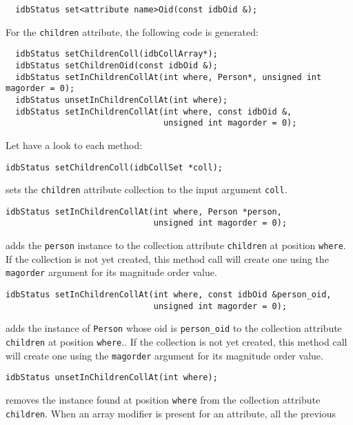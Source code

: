 \verbsize
\begin{verbatim}
  idbStatus set<attribute name>Oid(const idbOid &);
\end{verbatim}
\normalsize
For the \texttt{children} attribute, the following code is generated:
\verbsize
\begin{verbatim}
  idbStatus setChildrenColl(idbCollArray*);
  idbStatus setChildrenOid(const idbOid &);
  idbStatus setInChildrenCollAt(int where, Person*, unsigned int magorder = 0);
  idbStatus unsetInChildrenCollAt(int where);
  idbStatus setInChildrenCollAt(int where, const idbOid &,
                                unsigned int magorder = 0);
\end{verbatim}
\normalsize
Let have a look to each method:
\be
\item
\verbsize
\begin{verbatim}
idbStatus setChildrenColl(idbCollSet *coll);
\end{verbatim}
\normalsize
sets the \texttt{children} attribute collection to the input argument
\texttt{coll}.
\item
\verbsize
\begin{verbatim}
idbStatus setInChildrenCollAt(int where, Person *person,
                              unsigned int magorder = 0);
\end{verbatim}
\normalsize
adds the \texttt{person} instance to the collection attribute \texttt{children} at position \texttt{where}.
If the collection is not yet created, this method call will create one
using the \texttt{magorder} argument for its magnitude order value.
\item
\verbsize
\begin{verbatim}
idbStatus setInChildrenCollAt(int where, const idbOid &person_oid,
                              unsigned int magorder = 0);
\end{verbatim}
\normalsize
adds the instance of \texttt{Person} whose oid is \texttt{person\_oid}
to the collection attribute \texttt{children} at position \texttt{where}..
If the collection is not yet created, this method call will create one
using the \texttt{magorder} argument for its magnitude order value.
\item
\verbsize
\begin{verbatim}
idbStatus unsetInChildrenCollAt(int where);
\end{verbatim}
\normalsize
removes the instance found at position \texttt{where}
from the collection attribute \texttt{children}.
\ee
{}
When an array modifier is present for an attribute, all the previous
